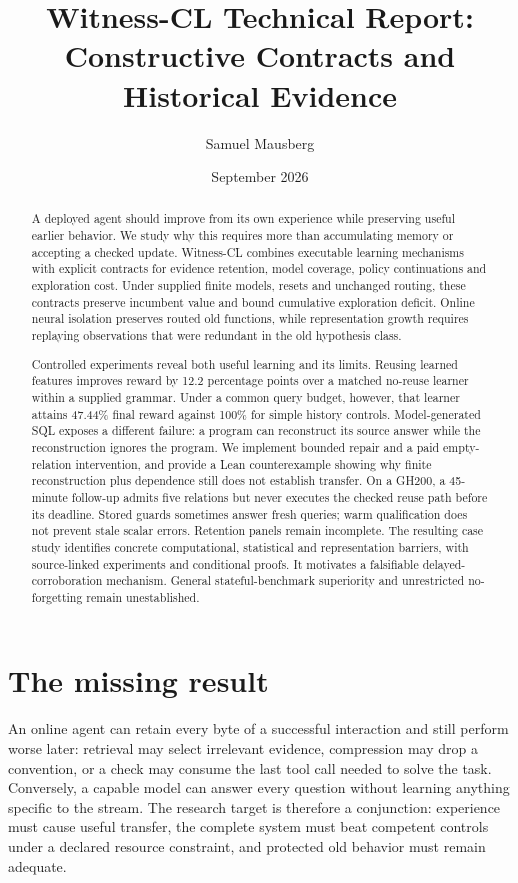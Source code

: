 \documentclass[10pt,twocolumn]{article}
\title{\vspace{-1.2em}\textbf{Witness-CL Technical Report:\\Constructive Contracts and Historical Evidence}}
\author{Samuel Mausberg}
\date{September 2026}
\begin{document}
\raggedbottom\maketitle
\begin{abstract}
A deployed agent should improve from its own experience while preserving useful
earlier behavior. We study why this requires more than accumulating memory or
accepting a checked update. Witness-CL combines executable learning mechanisms
with explicit contracts for evidence retention, model coverage, policy
continuations and exploration cost. Under supplied finite models, resets and
unchanged routing, these contracts preserve incumbent value and bound cumulative
exploration deficit. Online neural isolation preserves routed old functions,
while representation growth requires replaying observations that were redundant
in the old hypothesis class.

Controlled experiments reveal both useful learning and its limits. Reusing
learned features improves reward by 12.2 percentage points over a matched
no-reuse learner within a supplied grammar. Under a common query budget,
however, that learner attains 47.44\% final reward against 100\% for simple
history controls. Model-generated SQL exposes a different failure: a program
can reconstruct its source answer while the reconstruction ignores the program.
We implement bounded repair and a paid empty-relation intervention, and provide
a Lean counterexample showing why finite reconstruction plus dependence still
does not establish transfer. On a GH200, a 45-minute follow-up admits five
relations but never executes the checked reuse path before its deadline. Stored
guards sometimes answer fresh queries; warm qualification does not prevent
stale scalar errors. Retention panels remain incomplete. The resulting case study identifies concrete computational,
statistical and representation barriers, with source-linked experiments and
conditional proofs. It motivates a falsifiable delayed-corroboration mechanism.
General stateful-benchmark superiority and unrestricted no-forgetting remain
unestablished.
\end{abstract}

\section{The missing result}
An online agent can retain every byte of a successful interaction and still
perform worse later: retrieval may select irrelevant evidence, compression may
drop a convention, or a check may consume the last tool call needed to solve the
task. Conversely, a capable model can answer every question without learning
anything specific to the stream. The research target is therefore a conjunction:
experience must cause useful transfer, the complete system must beat competent
controls under a declared resource constraint, and protected old behavior must
remain adequate.
\end{document}
